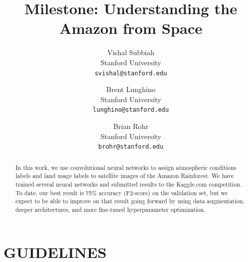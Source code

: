 \documentclass[10pt,twocolumn,letterpaper]{article}
\begin{document}
\title{Milestone: Understanding the Amazon from Space}

\author{Vishal Subbiah\\
Stanford University\\
{\tt\small svishal@stanford.edu}
\and
Brent Lunghino\\
Stanford University\\
{\tt\small lunghino@stanford.edu}
\and
Brian Rohr\\
Stanford University\\
{\tt\small brohr@stanford.edu}
}

\maketitle

\begin{abstract}
   In this work, we use convolutional neural networks to assign atmospheric conditions labels and land usage labels to satellite images of the Amazon Rainforest. We have trained several neural networks and submitted results to the Kaggle.com competition. To date, our best result is 75\% accuracy (F2-score) on the validation set, but we expect to be able to improve on that result going forward by using data augmentation, deeper architectures, and more fine-tuned hyperparameter optimization.
\end{abstract}

\section{GUIDELINES}
\end{document}
